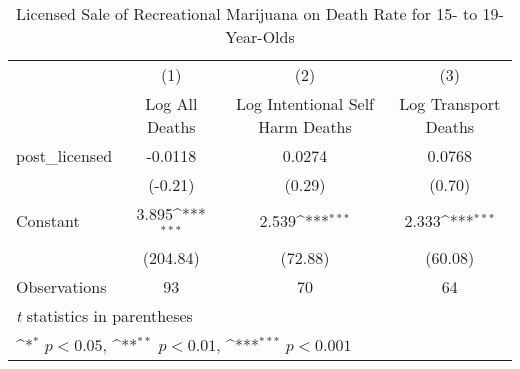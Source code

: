 \begin{table}[htbp]\centering
\def\sym#1{\ifmmode^{#1}\else\(^{#1}\)\fi}
\caption{Licensed Sale of Recreational Marijuana on Death Rate for 15- to 19-Year-Olds}
\begin{tabular}{l*{3}{c}}
\hline\hline
                    &\multicolumn{1}{c}{(1)}&\multicolumn{1}{c}{(2)}&\multicolumn{1}{c}{(3)}\\
                    &\multicolumn{1}{c}{Log All Deaths}&\multicolumn{1}{c}{Log Intentional Self Harm Deaths}&\multicolumn{1}{c}{Log Transport Deaths}\\
\hline
post\_licensed       &     -0.0118         &      0.0274         &      0.0768         \\
                    &     (-0.21)         &      (0.29)         &      (0.70)         \\
[1em]
Constant            &       3.895\sym{***}&       2.539\sym{***}&       2.333\sym{***}\\
                    &    (204.84)         &     (72.88)         &     (60.08)         \\
\hline
Observations        &          93         &          70         &          64         \\
\hline\hline
\multicolumn{4}{l}{\footnotesize \textit{t} statistics in parentheses}\\
\multicolumn{4}{l}{\footnotesize \sym{*} \(p<0.05\), \sym{**} \(p<0.01\), \sym{***} \(p<0.001\)}\\
\end{tabular}
\end{table}
